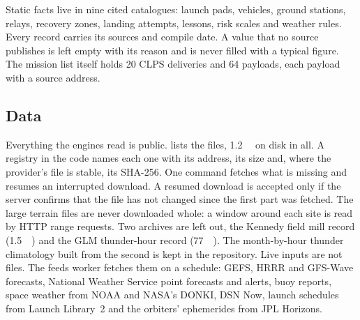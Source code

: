 \documentclass[11pt,a4paper]{article}
\begin{document}
Static facts live in nine cited catalogues: launch pads, vehicles, ground stations,
relays, recovery zones, landing attempts, lessons, risk scales and weather rules. Every
record carries its sources and compile date. A value that no source publishes is left
empty with its reason and is never filled with a typical figure. The mission list itself
holds 20 CLPS deliveries and 64 payloads, each payload with a source address.

\subsection{Data}
\label{sec:data}

Everything the engines read is public.  lists the files, \qty{1.2}{\giga\byte}
on disk in all. A registry in the code names each one with its address, its size and, where the
provider's file is stable, its SHA-256. One command fetches what is missing and resumes an
interrupted download. A resumed download is accepted only if the server confirms that the file
has not changed since the first part was fetched. The large terrain
files are never downloaded whole: a window around each site is read by HTTP range requests.
Two archives are left out, the Kennedy field mill record (\qty{1.5}{\tera\byte}) and the GLM
thunder-hour record (\qty{77}{\giga\byte}). The month-by-hour thunder climatology built from the
second is kept in the repository. Live inputs are not files. The feeds worker fetches them on a
schedule: GEFS, HRRR and GFS-Wave forecasts, National Weather Service point forecasts and
alerts, buoy reports, space weather from NOAA and NASA's DONKI, DSN Now, launch
schedules from Launch Library~2 and the orbiters' ephemerides from JPL Horizons.
\end{document}
